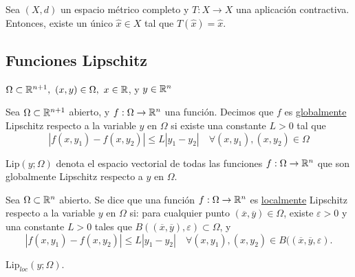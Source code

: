 \documentclass[a4paper]{report}
\begin{document}
\begin{theorem}
	Sea $(X,d)$ un espacio métrico completo y $T: X \to X$ una aplicación contractiva. Entonces, existe un único $\hat{x} \in X$ tal que $T(\hat{x}) = \hat{x}$.
\end{theorem}


\subsection{Funciones Lipschitz}

\begin{note}
	$\Omega \subset \mathbb{R}^{n+1},\ (x,y) \in \Omega,\ x \in \mathbb{R}$, y $y \in \mathbb{R}^n$
\end{note}

\begin{definition}
	Sea $\Omega \subset \mathbb{R}^{n+1}$ abierto, y $f : \Omega \to \mathbb{R}^n$ una función. Decimos que $f$ es \underline{globalmente} Lipschitz respecto a la variable $y$ en $\Omega$ si existe una constante $L>0$ tal que
	\[ |f(x,y_1) - f(x,y_2)| \leq L | y_1 - y_2 | \quad \forall (x,y_1), (x,y_2) \in \Omega \]
\end{definition}

\begin{note}
	Lip$(y;\Omega)$ denota el espacio vectorial de todas las funciones $f:\Omega\to\mathbb{R}^n$ que son globalmente Lipschitz respecto a $y$ en $\Omega$.
\end{note}

\begin{definition}
	Sea $\Omega \subset \mathbb{R}^n$ abierto. Se dice que una función $f: \Omega \to \mathbb{R}^n$ es \underline{localmente} Lipschitz respecto a la variable $y$ en $\Omega$ si: para cualquier punto $(\overline{x}, \overline{y})\in\Omega$, existe $\varepsilon>0$ y una constante $L>0$ tales que $B((\overline{x},\overline{y}),\varepsilon) \subset \Omega$, y 
	\[ |f(x,y_1) - f(x,y_2)| \leq L |y_1 - y_2| \quad \forall (x,y_1),(x,y_2) \in B((\overline{x},\overline{y},\varepsilon). \]
\end{definition}

\begin{note}
	$\text{Lip}_{\textit{loc}}(y;\Omega)$.
\end{note}
\end{document}

